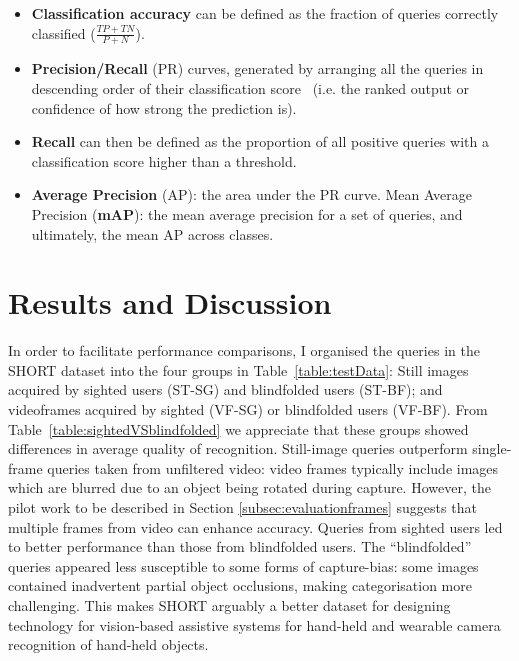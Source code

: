 \begin{itemize}

\item \textbf{Classification accuracy} can be defined as the fraction of queries correctly classified ($\frac{TP+TN}{P+N}$). 

\item \textbf{Precision/Recall} (PR) curves, generated by arranging all the queries in descending order of their classification score~\cite{Everingham2009} (i.e. the ranked output or confidence of how strong the prediction is). 

\item \textbf{Recall} can then be defined as the proportion of all positive queries with a classification score higher than a threshold. 

\item \textbf{Average Precision} (AP): the area under the PR curve. Mean Average Precision (\textbf{mAP}): the mean average precision for a set of queries, and ultimately, the mean AP across classes.

\end{itemize}


\section{Results and Discussion} \label{sec:analysis} \label{sec:results}


In order to facilitate performance comparisons, I organised the queries in the SHORT dataset into the four groups in Table~\ref{table:testData}: Still images acquired by sighted users (ST-SG) and blindfolded users (ST-BF); and videoframes acquired by sighted (VF-SG) or blindfolded users (VF-BF). From Table~\ref{table:sightedVSblindfolded} we appreciate that these groups showed differences in average quality of recognition. Still-image queries outperform single-frame queries taken from unfiltered video: video frames typically include images which are blurred due to an object being rotated during capture. However, the pilot work to be described in Section \ref{subsec:evaluationframes} suggests that multiple frames from video can enhance accuracy. Queries from sighted users led to better performance than those from blindfolded users. The ``blindfolded'' queries appeared less susceptible to some forms of  capture-bias: some images contained inadvertent partial object occlusions, making categorisation more challenging. This makes SHORT arguably a better dataset for designing technology for vision-based assistive systems for hand-held and wearable camera recognition of hand-held objects.


